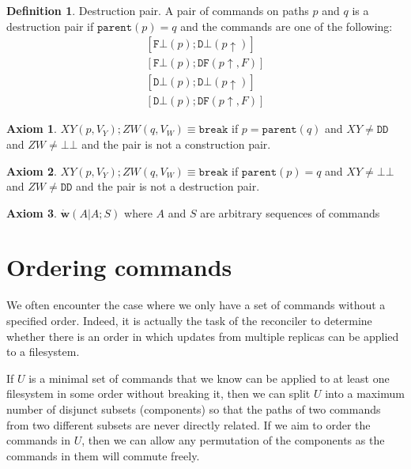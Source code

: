 \documentclass[12pt]{article}
\newcommand{\empt}{\bot}
\newcommand{\parent}{\mathtt{parent}}
\newcommand{\pp}{p\!\!\uparrow} %
\newcommand{\cbrk}{\mathtt{break}}
\newcommand{\fscommand}[2]{{#1#2}}
\newcommand{\fsregcommandchar}[1]{\mathtt{#1}}
\newcommand{\fsregcommand}[2]{\fscommand{\fsregcommandchar{#1}}{\fsregcommandchar{#2}}}
\newcommand{\cbb}{\fsregcommand{\empt}{\empt}}
\newcommand{\cfb}{\fsregcommand{F}{\empt}}
\newcommand{\cdb}{\fsregcommand{D}{\empt}}
\newcommand{\cdf}{\fsregcommand{D}{F}}
\newcommand{\cdd}{\fsregcommand{D}{D}}
\newcommand{\cxy}{\fscommand{X}{Y}}
\newcommand{\czw}{\fscommand{Z}{W}}
\newcommand{\worksc}[2]{\dot{\mathbf{w}}({#1}|{#2})}
\theoremstyle{definition}
\newtheorem{mydef}{Definition}
\newtheorem{myax}{Axiom}
\begin{document}
\begin{mydef}{Destruction pair.}
A pair of commands on paths $p$ and $q$ is a destruction pair if $\parent(p)=q$ and the commands are one
of the following:
   \begin{gather*}
            [\cfb(p); \cdb(\pp)] \\
            [\cfb(p); \cdf(\pp, F)] \\
            [\cdb(p); \cdb(\pp)] \\
            [\cdb(p); \cdf(\pp, F)]
   \end{gather*}
\end{mydef}

\begin{myax}\label{ax_directchild_breaks}
$\cxy(p,V_Y); \czw(q,V_W) \equiv \cbrk$ if $p=\parent(q)$ and $\cxy\neq\cdd$ and $\czw\neq\cbb$
and the pair is not a construction pair.
\end{myax}

\begin{myax}\label{ax_directparent_breaks}
$\cxy(p,V_Y); \czw(q,V_W) \equiv \cbrk$ if $\parent(p)=q$ and $\cxy\neq\cbb$ and $\czw\neq\cdd$
and the pair is not a destruction pair.
\end{myax}

\begin{myax}\label{worksextpostfix}
$\worksc{A}{A;S}$ where $A$ and $S$ are arbitrary sequences of commands
\end{myax}




\section{Ordering commands}

We often encounter the case where we only have a set of commands without a specified order.
Indeed, it is actually the task of the reconciler to determine whether there is an order
in which updates from multiple replicas can be applied to a filesystem.

If $U$ is a minimal set of commands
that we know can be applied to at least one filesystem in some order without breaking it,
then we can split $U$ into a maximum number of disjunct subsets
(components) so that the paths of two commands from two different subsets are never directly related.
If we aim to order the commands in $U$, then we can allow any permutation of 
the components as the commands in them will commute freely.
\end{document}
